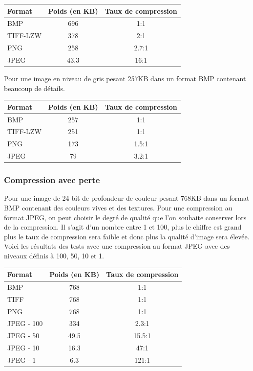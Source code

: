 \documentclass[a4paper, 11pt]{article} %
\begin{document}
\begin{center}
\centering
	\begin{tabular}{|l|c|c|}
		\hline
		Format & Poids (en KB)& Taux de compression\\
		\hline
		BMP&696&1:1\\
		TIFF-LZW&378&2:1\\
		PNG&258&2.7:1\\
		JPEG&43.3&16:1\\
		\hline
	\end{tabular}
\end {center}

Pour une image en niveau de gris pesant 257KB dans un format BMP contenant beaucoup de détails.
\begin{center}
\centering
	\begin{tabular}{|l|c|c|}
		\hline
		Format & Poids (en KB)& Taux de compression\\
		\hline
		BMP&257&1:1\\
		TIFF-LZW&251&1:1\\
		PNG&173&1.5:1\\
		JPEG&79&3.2:1\\
		\hline
	\end{tabular}
\end{center}

\subsubsection{Compression avec perte}

Pour une image de 24 bit de profondeur de couleur pesant 768KB dans un format BMP contenant des couleurs vives et des textures. Pour une compression au format JPEG, on peut choisir le degré de qualité que l'on souhaite conserver lors de la compression. Il s'agit d'un nombre entre 1 et 100, plus le chiffre est grand plus le taux de compression sera faible et donc plus la qualité d'image sera élevée. Voici les résultats des tests avec une compression au format JPEG avec des niveaux définis à 100, 50, 10 et 1.

\begin{center}
	\begin{tabular}{|l|c|c|}
		\hline
		Format & Poids (en KB)& Taux de compression\\
		\hline
		BMP&768&1:1\\
		TIFF&768&1:1\\
		PNG&768&1:1\\
		JPEG - 100&334&2.3:1\\
		JPEG - 50&49.5&15.5:1\\
		JPEG - 10&16.3&47:1\\
		JPEG - 1&6.3&121:1\\
		\hline
	\end{tabular}
\end{center}
\end{document}
